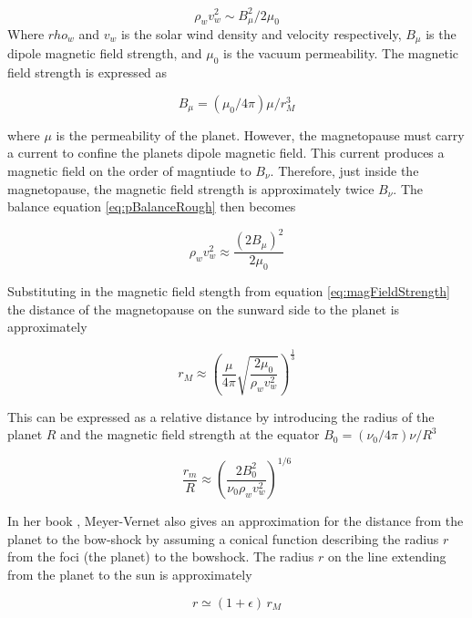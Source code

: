 \begin{equation}\label{eq:pBalanceRough}
\rho_w v^2_w \sim B^2_{\mu} / 2 \mu_0  
\end{equation}
Where $rho_w$ and $v_w$ is the solar wind density and velocity respectively, $B_{\mu}$ is the dipole magnetic field strength, and $\mu_0$ is the vacuum permeability. The magnetic field strength is expressed as

\begin{equation}\label{eq:magFieldStrength}
    B_{\mu} = (\mu_0 / 4 \pi) \mu / r^3_M
\end{equation}

where $\mu$ is the permeability of the planet. However, the magnetopause must carry a current to confine the planets dipole magnetic field. This current produces a magnetic field on the order of magntiude to $B_{\nu}$. Therefore, just inside the magnetopause, the magnetic field strength is approximately twice $B_{\nu}$. The balance equation \ref{eq:pBalanceRough} then becomes 

\begin{equation}\label{eq:pressureBalance}
    \rho_w v^2_w \approx \frac{(2 B_{\mu})^2}{2 \mu_0} 
\end{equation}

Substituting in the magnetic field stength from equation \ref{eq:magFieldStrength} the distance of the magnetopause on the sunward side to the planet is approximately 

\begin{equation}\label{eq:magnetopause}
    r_M \approx \left(\frac{\mu}{4 \pi} \sqrt{\frac{2 \mu_0}{\rho_w v^2_w}} \right)^{\frac{1}{3}}
\end{equation}

This can be expressed as a relative distance by introducing the radius of the planet $R$ and the magnetic field strength at the equator $B_0 = (\nu_0 / 4 \pi) \nu / R^3$

\begin{equation}
    \frac{r_m}{R} \approx \left(\frac{2 B^2_0}{\nu_0 \rho_w v^2_w} \right)^{1/6}
\end{equation}


In her book , Meyer-Vernet also gives an approximation for the distance from the planet to the bow-shock by assuming a conical function describing the radius $r$ from the foci (the planet) to the bowshock. The radius $r$ on the line extending from the planet to the sun is approximately

\begin{equation}
    r \simeq (1 + \epsilon) \, r_M
\end{equation}

